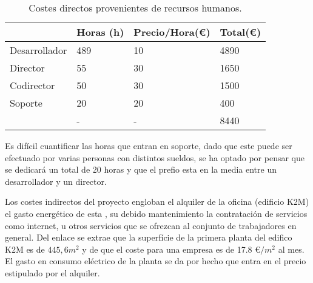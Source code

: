 \begin{table}[H]
\begin{tabular}{l|l|l|l|}
\cline{2-4}
                                                    & Horas (h) & Precio/Hora(\euro) & Total(\euro) \\ \hline
\multicolumn{1}{|l|}{Desarrollador}                 & 489       & 10               & 4890     \\ \hline
\multicolumn{1}{|l|}{Director}                      & 55        & 30               & 1650     \\ \hline
\multicolumn{1}{|l|}{Codirector}                    & 50        & 30               & 1500     \\ \hline
\multicolumn{1}{|l|}{Soporte}                       & 20        & 20               & 400      \\ \hline
\rowcolor{gray!50}
\multicolumn{1}{|l|}{Total} &    -       &  -              &  8440        \\ \hline
\end{tabular}
\caption{Costes directos provenientes de recursos humanos.}
\end{table}

Es difícil cuantificar las horas que entran en soporte, dado que este puede ser efectuado por varias personas con distintos sueldos, se ha optado por pensar que se dedicará un total de 20 horas y que el prefio esta en la media entre un desarrollador y un director.

\par\bigskip

Los costes indirectos del proyecto engloban el alquiler de la oficina (edificio K2M) el gasto energético de esta , su debido mantenimiento la contratación de servicios como internet, u otros servicios que se ofrezcan al conjunto de trabajadores en general. Del enlace \cite{k2msuperficie} se extrae que la superfície de la primera planta del edifico K2M es de $445,6 m^{2}$ y de \cite{k2mpreu} que el coste para una empresa es de 17.8 \euro$/m^{2}$ al mes. El gasto en consumo eléctrico de la planta se da por hecho que entra en el precio estipulado por el alquiler.

